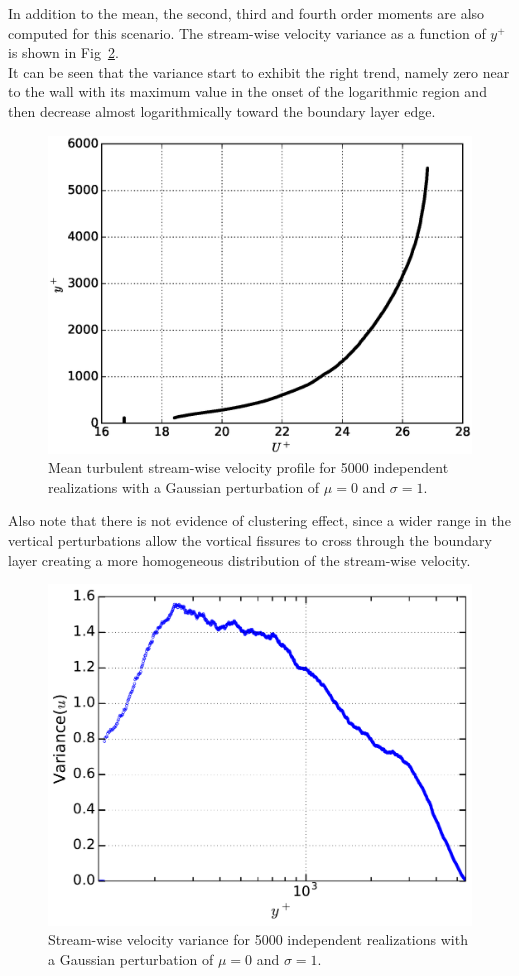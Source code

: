 \documentclass[aps,reprint,amsmath,amssymb,pra]{revtex4-1}%
\begin{document}
In addition to the mean, the second, third and fourth order moments are also computed for this scenario. The stream-wise velocity variance as a function of $y^+$ is shown in Fig~\ref{fig:varigaus100}.\\ 
It can be seen that the variance start to exhibit the right trend, namely zero near to the wall with its maximum value in the onset of the logarithmic region and then decrease almost logarithmically toward the boundary layer edge. 
\begin{figure}[tb]
\includegraphics[scale=0.46]{figures/Master_averaged_step_profile_5000_assembles_gaus100}
\caption{\label{fig:mp_gau100} Mean turbulent stream-wise velocity profile for 5000 independent realizations with a Gaussian perturbation of $\mu=0$ and $\sigma=1$.}
\end{figure}
Also note that there is not evidence of clustering effect, since a wider range in the vertical perturbations allow the vortical fissures to cross through the boundary layer creating a more homogeneous distribution of the stream-wise velocity. 
\begin{figure}[b]
\includegraphics[scale=0.46]{figures/variance_5000_assembles_gauss100}
\caption{\label{fig:varigaus100} Stream-wise velocity variance for 5000 independent realizations with a Gaussian perturbation of $\mu=0$ and $\sigma=1$.}
\end{figure}
\end{document}

